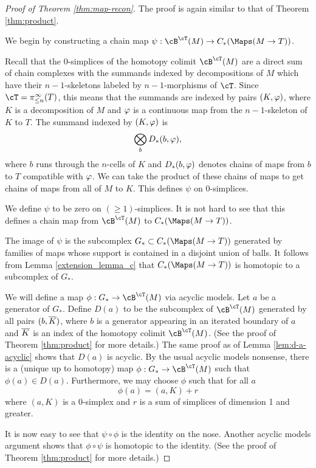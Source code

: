 \begin{proof}[Proof of Theorem \ref{thm:map-recon}]
The proof is again similar to that of Theorem \ref{thm:product}.

We begin by constructing a chain map $\psi: \cB^\cT(M) \to C_*(\Maps(M\to T))$.

Recall that 
the 0-simplices of the homotopy colimit $\cB^\cT(M)$ 
are a direct sum of chain complexes with the summands indexed by
decompositions of $M$ which have their $n{-}1$-skeletons labeled by $n{-}1$-morphisms
of $\cT$.
Since $\cT = \pi^\infty_{\leq n}(T)$, this means that the summands are indexed by pairs
$(K, \varphi)$, where $K$ is a decomposition of $M$ and $\varphi$ is a continuous
map from the $n{-}1$-skeleton of $K$ to $T$.
The summand indexed by $(K, \varphi)$ is
\[
	\bigotimes_b D_*(b, \varphi),
\]
where $b$ runs through the $n$-cells of $K$ and $D_*(b, \varphi)$ denotes
chains of maps from $b$ to $T$ compatible with $\varphi$.
We can take the product of these chains of maps to get chains of maps from
all of $M$ to $K$.
This defines $\psi$ on 0-simplices.

We define $\psi$ to be zero on $(\ge1)$-simplices.
It is not hard to see that this defines a chain map from 
$\cB^\cT(M)$ to $C_*(\Maps(M\to T))$.

The image of $\psi$ is the subcomplex $G_*\sub C_*(\Maps(M\to T))$ generated by 
families of maps whose support is contained in a disjoint union of balls.
It follows from Lemma \ref{extension_lemma_c} 
that $C_*(\Maps(M\to T))$ is homotopic to a subcomplex of $G_*$.

We will define a map $\phi:G_*\to \cB^\cT(M)$ via acyclic models.
Let $a$ be a generator of $G_*$.
Define $D(a)$ to be the subcomplex of $\cB^\cT(M)$ generated by all 
pairs $(b, \overline{K})$, where $b$ is a generator appearing in an iterated boundary of $a$
and $\overline{K}$ is an index of the homotopy colimit $\cB^\cT(M)$.
(See the proof of Theorem \ref{thm:product} for more details.)
The same proof as of Lemma \ref{lem:d-a-acyclic} shows that $D(a)$ is acyclic.
By the usual acyclic models nonsense, there is a (unique up to homotopy)
map $\phi:G_*\to \cB^\cT(M)$ such that $\phi(a)\in D(a)$.
Furthermore, we may choose $\phi$ such that for all $a$ 
\[
	\phi(a) = (a, K) + r
\]
where $(a, K)$ is a 0-simplex and $r$ is a sum of simplices of dimension 1 and greater.

It is now easy to see that $\psi\circ\phi$ is the identity on the nose.
Another acyclic models argument shows that $\phi\circ\psi$ is homotopic to the identity.
(See the proof of Theorem \ref{thm:product} for more details.)
\end{proof}